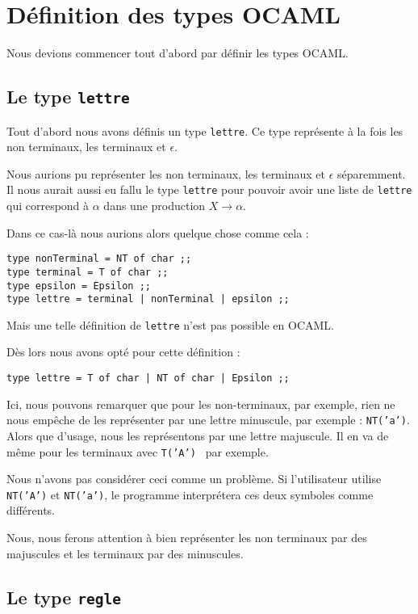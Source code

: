 \documentclass[11pt,a4paper]{article}
\def\code#1{\texttt{#1}} %
\begin{document}
\section{Définition des types OCAML}

Nous devions commencer tout d'abord par définir les types OCAML.
\newline

\subsection{Le type \code{lettre}}
Tout d'abord nous avons définis un type \code{lettre}. Ce type
représente à la fois les non terminaux, les terminaux et $\epsilon$.

Nous aurions pu représenter les non terminaux, les terminaux et
$\epsilon$ séparemment. Il nous aurait aussi eu fallu le type \code{lettre}
pour pouvoir avoir une liste de \code{lettre} qui correspond à $\alpha$
dans une production $X \rightarrow \alpha$.

Dans ce cas-là nous aurions alors quelque chose comme cela :
\begin{verbatim}
type nonTerminal = NT of char ;;
type terminal = T of char ;;
type epsilon = Epsilon ;;
type lettre = terminal | nonTerminal | epsilon ;;
\end{verbatim}

Mais une telle définition de \code{lettre} n'est pas possible en OCAML.

Dès lors nous avons opté pour cette définition :
\begin{verbatim}
type lettre = T of char | NT of char | Epsilon ;;
\end{verbatim}

Ici, nous pouvons remarquer que pour les non-terminaux,
par exemple, rien ne nous empêche de les représenter par
une lettre minuscule, par exemple : \code{NT('a')}.
Alors que d'usage,
nous les représentons par une lettre majuscule.
Il en va de même pour les terminaux avec \code{T('A') } par
exemple.

Nous n'avons pas considérer ceci comme un problème. Si
l'utilisateur utilise \code{NT('A')} et \code{NT('a')}, le
programme interprétera ces deux symboles comme différents.

Nous, nous ferons attention à bien représenter les non terminaux
par des majuscules et les terminaux par des minuscules.

\subsection{Le type \code{regle}}
\end{document}
